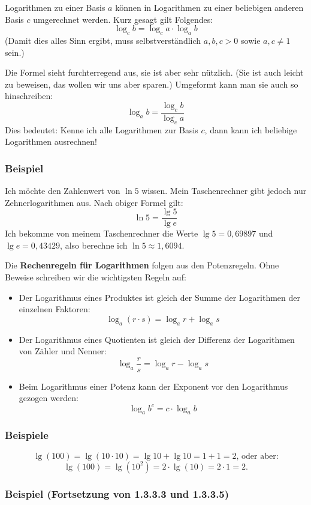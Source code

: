 Logarithmen zu einer Basis $a$ können in Logarithmen zu einer beliebigen anderen Basis $c$ umgerechnet werden. Kurz gesagt gilt Folgendes:
\[ \log_c b = \log_c a \cdot \log_a b \]
(Damit dies alles Sinn ergibt, muss selbstverständlich $a, b, c > 0$ sowie $a, c \neq 1$ sein.)

Die Formel sieht furchterregend aus, sie ist aber sehr nützlich. (Sie ist auch leicht zu beweisen, das wollen wir uns aber sparen.) Umgeformt kann man sie auch so hinschreiben:
\[ \log_a b = \frac{\log_c b}{\log_c a} \]
Dies bedeutet: Kenne ich alle Logarithmen zur Basis $c$, dann kann ich beliebige Logarithmen ausrechnen!

\subsubsection{Beispiel}

Ich möchte den Zahlenwert von $\ln 5$ wissen. Mein Taschenrechner gibt jedoch nur Zehnerlogarithmen aus. Nach obiger Formel gilt:
\[ \ln 5 = \frac{\lg 5}{\lg e} \]
Ich bekomme von meinem Taschenrechner die Werte $\lg 5 = 0{,}69897$ und $\lg e = 0{,}43429$, also berechne ich $\ln 5 \approx 1{,}6094$.\beispielende

Die \textbf{Rechenregeln für Logarithmen} folgen aus den Potenzregeln. Ohne Beweise schreiben wir die wichtigsten Regeln auf:
\begin{itemize}
  \item Der Logarithmus eines Produktes ist gleich der Summe der Logarithmen der einzelnen Faktoren:
  \[ \log_a (r \cdot s) = \log_a r + \log_a s \]
  \item Der Logarithmus eines Quotienten ist gleich der Differenz der Logarithmen von Zähler und Nenner:
  \[ \log_a \frac{r}{s} = \log_a r - \log_a s \]
  \item Beim Logarithmus einer Potenz kann der Exponent vor den Logarithmus gezogen werden:
  \[ \log_a b^c = c \cdot \log_a b \]
\end{itemize}

\subsubsection{Beispiele}

\[ \lg(100) = \lg(10 \cdot 10) = \lg 10 + \lg 10 = 1 + 1 = 2 \text{, oder aber:} \]
\[ \lg(100) = \lg(10^2) = 2 \cdot \lg(10) = 2 \cdot 1 = 2 .\]\beispielende

\subsubsection{Beispiel (Fortsetzung von 1.3.3.3 und 1.3.3.5)}

